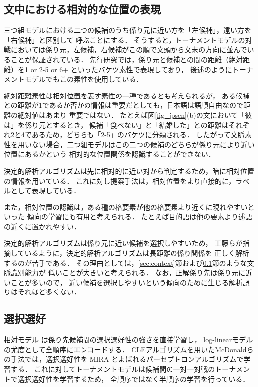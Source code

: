 \documentclass[japanese]{jnlp_1.4}
\begin{document}
\subsection{文中における相対的な位置の表現}
\label{sec:relative}

三つ組モデルにおける二つの候補のうち係り元に近い方を「左候補」，遠い方を「右候補」と区別して
呼ぶことにする．
そうすると，トーナメントモデルの対戦においては係り元，左候補，右候補がこの順で文頭から文末の方向に並んでいることが保証されている．
先行研究では，係り元と候補との間の距離（絶対距離）を1 or 2-5 or 6+ といったバケツ素性で表現しており，
後述のようにトーナメントモデルでもこの素性を使用している．

絶対距離素性は相対位置を表す素性の一種であるとも考えられるが，
ある候補との距離が1であるか否かの情報は重要だとしても，日本語は語順自由なので距離の絶対値はあまり
重要ではない．
たとえば図\ref{fig_jpsen}(b)の文において「彼は」を係り元とするとき，
候補「食べない」と「結婚した」との距離はそれぞれ2と4であるため，どちらも「2-5」のバケツに分類される．
したがって文脈素性を用いない場合，二つ組モデルはこの二つの候補のどちらが係り元により近い位置にあるかという
相対的な位置関係を認識することができない．

決定的解析アルゴリズムは先に相対的に近い対から判定するため，暗に相対位置の情報を用いている．
これに対し提案手法は，相対位置をより直接的に，ラベルとして表現している．

また，相対位置の認識は，ある種の格要素が他の格要素より近くに現れやすいといった
傾向の学習にも有用と考えられる．
たとえば目的語は他の要素より述語の近くに置かれやすい．


決定的解析アルゴリズムは係り元に近い候補を選択しやすいため，
工藤らが指摘しているように，決定的解析アルゴリズムは長距離の係り関係を
正しく解析するのが苦手である．
その理由としては，\ref{sec:context}節および\ref{sec:relative}節のような文脈識別能力が
低いことが大きいと考えられる．
なお，正解係り先は係り元に近いことが多いので，
近い候補を選択しやすいという傾向のために生じる解析誤りはそれほど多くない．


\subsection{選択選好}
\label{sec:selectional}

相対モデル  は係り先候補間の選択選好性の強さを直接学習し，
log-linearモデルの尤度として全順序にエンコードする．
CLEアルゴリズムを用いたMcDonaldらの手法では，選択選好性を
MIRA とよばれるパーセプトロンアルゴリズムで学習する．
これに対してトーナメントモデルは候補間の一対一対戦のトーナメントで選択選好性を学習するため，
全順序ではなく半順序の学習を行っている．
\end{document}
